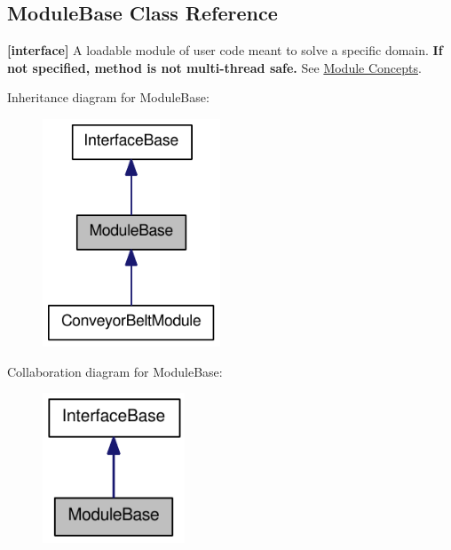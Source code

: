 \hypertarget{classOpenRAVE_1_1ModuleBase}{
\subsection{ModuleBase Class Reference}
\label{classOpenRAVE_1_1ModuleBase}
}


{\bfseries \mbox{[}interface\mbox{]}} A loadable module of user code meant to solve a specific domain. {\bfseries If not specified, method is not multi-\/thread safe.} See \hyperlink{arch__module}{Module Concepts}.  




Inheritance diagram for ModuleBase:\nopagebreak
\begin{figure}[H]
\begin{center}
\leavevmode
\includegraphics[width=150pt]{classOpenRAVE_1_1ModuleBase__inherit__graph}
\end{center}
\end{figure}


Collaboration diagram for ModuleBase:\nopagebreak
\begin{figure}[H]
\begin{center}
\leavevmode
\includegraphics[width=120pt]{classOpenRAVE_1_1ModuleBase__coll__graph}
\end{center}
\end{figure}

